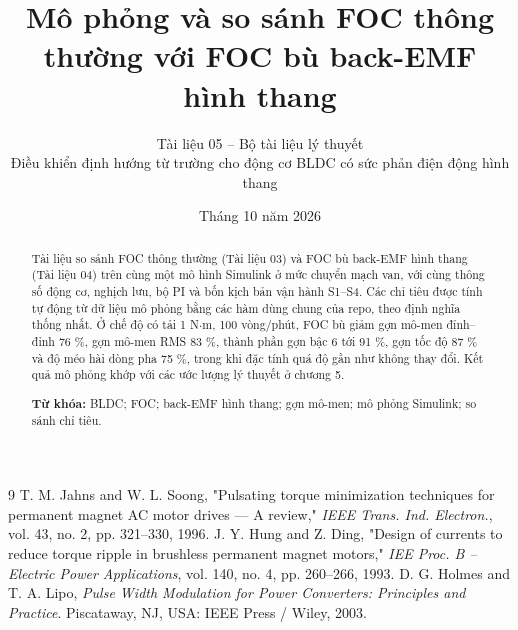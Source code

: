 \documentclass[11pt,a4paper]{article}
\title{\vspace{-1.2cm}\textbf{Mô phỏng và so sánh FOC thông thường với FOC bù back-EMF hình thang}}
\author{\normalsize Tài liệu 05 -- Bộ tài liệu lý thuyết\\[2pt]
\small Điều khiển định hướng từ trường cho động cơ BLDC có sức phản điện động hình thang}
\date{\small Tháng 10 năm 2026}
\begin{document}
\maketitle

\begin{abstract}
\noindent Tài liệu so sánh FOC thông thường (Tài liệu 03) và FOC bù back-EMF hình thang (Tài liệu 04) trên cùng một mô hình Simulink ở mức chuyển mạch van, với cùng thông số động cơ, nghịch lưu, bộ PI và bốn kịch bản vận hành S1–S4. Các chỉ tiêu được tính tự động từ dữ liệu mô phỏng bằng các hàm dùng chung của repo, theo định nghĩa thống nhất. Ở chế độ có tải 1 N$\cdot$m, 100 vòng/phút, FOC bù giảm gợn mô-men đỉnh–đỉnh 76 \%, gợn mô-men RMS 83 \%, thành phần gợn bậc 6 tới 91 \%, gợn tốc độ 87 \% và độ méo hài dòng pha 75 \%, trong khi đặc tính quá độ gần như không thay đổi. Kết quả mô phỏng khớp với các ước lượng lý thuyết ở chương 5.

\vspace{0.5em}
\noindent\textbf{Từ khóa:} BLDC; FOC; back-EMF hình thang; gợn mô-men; mô phỏng Simulink; so sánh chỉ tiêu.
\end{abstract}


\tableofcontents
\newpage



\setcounter{section}{6}


\begin{thebibliography}{9}
\small
{} T. M. Jahns and W. L. Soong, "Pulsating torque minimization techniques for permanent magnet AC motor drives — A review," \emph{IEEE Trans. Ind. Electron.}, vol. 43, no. 2, pp. 321–330, 1996.
 J. Y. Hung and Z. Ding, "Design of currents to reduce torque ripple in brushless permanent magnet motors," \emph{IEE Proc. B – Electric Power Applications}, vol. 140, no. 4, pp. 260–266, 1993.
 D. G. Holmes and T. A. Lipo, \emph{Pulse Width Modulation for Power Converters: Principles and Practice}. Piscataway, NJ, USA: IEEE Press / Wiley, 2003.
\end{thebibliography}
\end{document}
